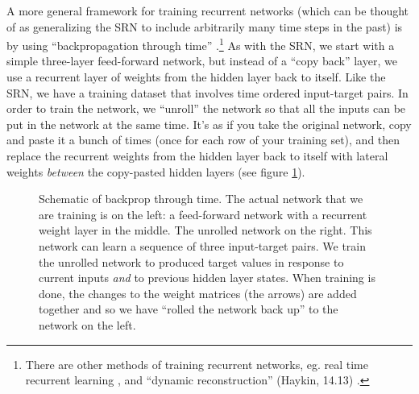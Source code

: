 A more general framework for training recurrent networks (which can be thought of as generalizing the SRN to include arbitrarily many time steps in the past) is by using ``backpropagation through time'' \cite{werbos1990bptt}.\footnote{There are other methods of training recurrent networks, eg. real time recurrent learning \cite{williams1989learning}, and ``dynamic reconstruction'' (Haykin, 14.13) \cite{haykin1998neural}.} As with the SRN, we start with a simple three-layer feed-forward network, but instead of a ``copy back''  layer, we use a recurrent layer of weights from the hidden layer back to itself. Like the SRN, we have a training dataset that involves time ordered input-target pairs. In order to train the network, we ``unroll'' the network so that all the inputs can be put in the network at the same time. It's as if you take the original network, copy and paste it a bunch of times (once for each row of your training set), and then replace the recurrent weights from the hidden layer back to itself with lateral weights \emph{between} the copy-pasted hidden layers (see figure \ref{bptt}). 

\begin{figure}[h]
\centering
{}
\caption[Jeff Yoshimi.]{Schematic of backprop through time. The actual network that we are training is on the left: a feed-forward network with a recurrent weight layer in the middle. The unrolled network on the right. This network can learn a sequence of three input-target pairs. We train the unrolled network to produced target values in response to current inputs \emph{and} to previous hidden layer states. When training is done, the changes to the weight matrices (the arrows) are added together and so we have ``rolled the network back up'' to the network on the left.}
\label{bptt}
\end{figure}

